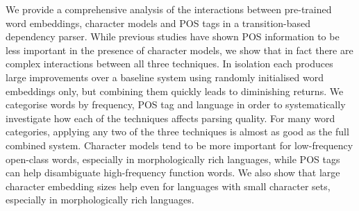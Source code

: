 We provide a comprehensive analysis of the interactions between pre-trained word embeddings, character models and POS tags in a transition-based dependency parser. While previous studies have shown POS information to be less important in the presence of character models, we show that in fact there are complex interactions between all three techniques. In isolation each produces large improvements over a baseline system using randomly initialised word embeddings only, but combining them quickly leads to diminishing returns. We categorise words by frequency, POS tag and language in order to systematically investigate how each of the techniques affects parsing quality. For many word categories, applying any two of the three techniques is almost as good as the full combined system. Character models tend to be more important for low-frequency open-class words, especially in morphologically rich languages, while POS tags can help disambiguate high-frequency function words. We also show that large character embedding sizes help even for languages with small character sets, especially in morphologically rich languages.
